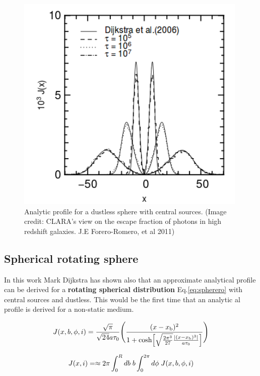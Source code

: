 \begin{figure}[H]
\begin{center}
\includegraphics[scale=0.4]{Figures/Sphere.png}
\end{center}\caption{Analytic profile for a dustless sphere with central \ly sources.  (Image credit: CLARA's view on the escape fraction of \ly photons in high redshift galaxies. J.E Forero-Romero, et al 2011)\label{fig:sphere}}
\end{figure}

\subsection{Spherical rotating sphere}

In this work Mark Dijkstra has shown also that an approximate analytical profile
can be derived for a {\bf{rotating spherical distribution}} Eq.\ref{eq:spherero}
with central sources and dustless. This would be the first time that an analytic
al profile is derived for a non-static medium.  

\begin{equation}\label{eq:spherero}
J(x,b,\phi,i)=\frac{\sqrt{\pi}}{\sqrt{24}a\tau_0}\Bigg{(}\frac{(x-x_{\rm
b})^2}{1+{\rm cosh}\Big{[}\sqrt{\frac{2\pi^3}{27}}\frac{|(x
-x_{\rm b})^3|}{a\tau_0}\Big{]}}\Bigg{)}
\end{equation}

\begin{equation}
J(x,i)= \approx 2\pi \int_0^Rdb {\hspace{1mm}} b
\int_0^{2\pi}d\phi {\hspace{1mm}} J(x,b,\phi,i)\\ \nonumber
\end{equation}

